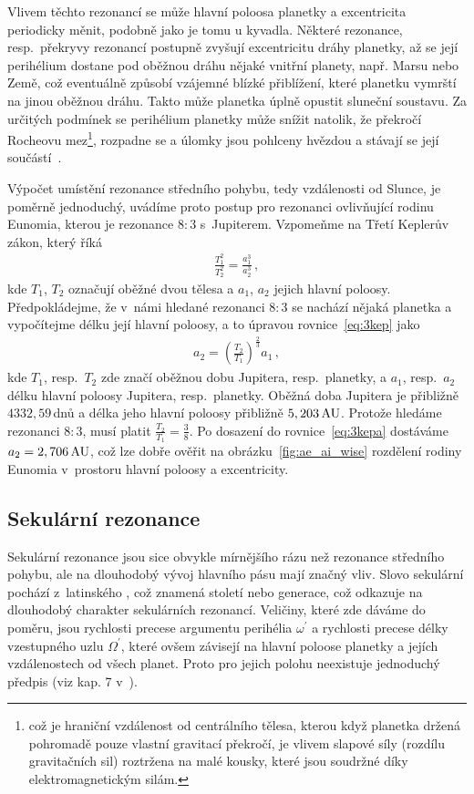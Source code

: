 \documentclass[A4paper, 12pt, oneside]{book}
\begin{document}
Vlivem těchto rezonancí se může hlavní poloosa planetky a excentricita periodicky měnit, podobně jako je tomu u kyvadla. Některé rezonance, resp.\ překryvy rezonancí postupně zvyšují excentricitu dráhy planetky, až se její perihélium dostane pod oběžnou dráhu nějaké vnitřní planety, např. Marsu nebo Země, což eventuálně způsobí vzájemné blízké přiblížení, které planetku vymrští na jinou oběžnou dráhu. Takto může planetka úplně opustit sluneční soustavu. Za určitých podmínek se perihélium planetky může snížit natolik, že překročí Rocheovu mez\footnote{což je hraniční vzdálenost od centrálního tělesa, kterou když planetka držená pohromadě pouze vlastní gravitací překročí, je vlivem slapové síly (rozdílu gravitačních sil) roztržena na malé kousky, které jsou soudržné díky elektromagnetickým silám.}, rozpadne se a úlomky jsou pohlceny hvězdou a stávají se její součástí~\cite{pichierri17}.

Výpočet umístění rezonance středního pohybu, tedy vzdálenosti od Slunce, je poměrně jednoduchý, uvádíme proto postup pro rezonanci ovlivňující rodinu Eunomia, kterou je rezonance $8:3$ s~Jupiterem. Vzpomeňme na Třetí Keplerův zákon, který říká
\begin{align} \label{eq:3kep}
	\frac{T_1^2}{T_2^2}=\frac{a_1^3}{a_2^3}\,, 
\end{align}
kde $T_1$, $T_2$ označují oběžné dvou tělesa a $a_1$, $a_2$ jejich hlavní poloosy. Předpokládejme, že v~námi hledané rezonanci $8:3$ se nachází nějaká planetka a vypočítejme délku její hlavní poloosy, a to úpravou rovnice~\eqref{eq:3kep} jako
\begin{align} \label{eq:3kepa}
	a_2=\left(\frac{T_2}{T_1}\right)^{\frac{2}{3}}a_1\,,
\end{align}
kde $T_1$, resp.\ $T_2$ zde značí oběžnou dobu Jupitera, resp.\ planetky, a $a_1$, resp.\ $a_2$ délku hlavní poloosy Jupitera, resp.\ planetky. Oběžná doba Jupitera je přibližně $4332,59\,$dnů a délka jeho hlavní poloosy přibližně $5,203\,{\rm AU}$. Protože hledáme rezonanci $8:3$, musí platit $\frac{T_2}{T_1}=\frac{3}{8}$. Po dosazení do rovnice~\eqref{eq:3kepa} dostáváme $a_2=2,706\,{\rm AU}$, což lze dobře ověřit na obrázku~\ref{fig:ae_ai_wise} rozdělení rodiny Eunomia v~prostoru hlavní poloosy a excentricity.
\subsection{Sekulární rezonance} 
Sekulární rezonance jsou sice obvykle mírnějšího rázu než rezonance středního pohybu, ale na dlouhodobý vývoj hlavního pásu mají značný vliv. Slovo sekulární pochází z~latinského , což znamená století nebo generace, což odkazuje na dlouhodobý charakter sekulárních rezonancí. Veličiny, které zde dáváme do poměru, jsou rychlosti precese argumentu perihélia $\omega^\prime$ a rychlosti precese délky vzestupného uzlu $\Omega^\prime$, které ovšem závisejí na hlavní poloose planetky a jejích vzdálenostech od všech planet. Proto pro jejich polohu neexistuje jednoduchý předpis (viz kap. 7 v~\cite{murray00}).
\end{document}

